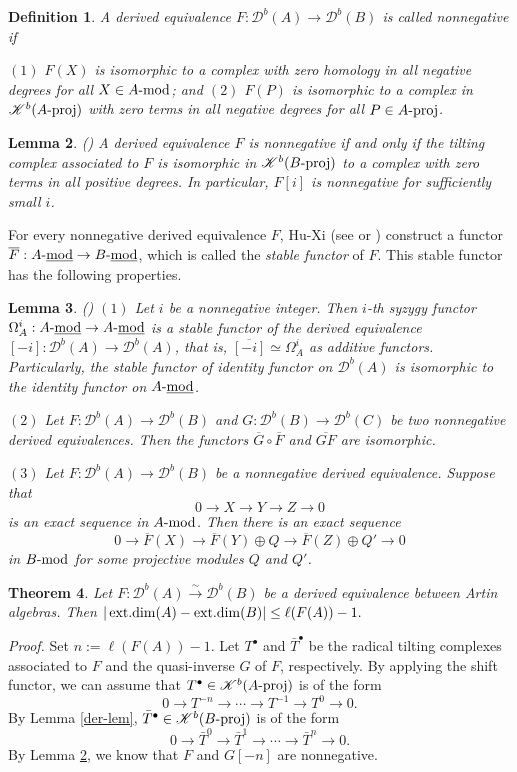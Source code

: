 \documentclass[12pt]{article}
\numberwithin{equation}{section}
\newtheorem{Def}{Definition}[section]
\newtheorem{Theo}[Def]{Theorem}
\newtheorem{Lem}[Def]{Lemma}
\theoremstyle{definition}
\def\ed{\mathop{\rm ext.dim}\nolimits}
\newcommand{\cpx}[1]{#1^{\bullet}}
\newcommand{\Db}[1]{{\mathscr D}^b(#1)}
\newcommand{\Kb}[1]{{\mathscr K}^b(#1)}
\newcommand{\modcat}{\ensuremath{\mbox{{\rm -mod}}}}
\newcommand{\stmodcat}[1]{#1\mbox{{\rm -{\underline{mod}}}}}
\newcommand{\pmodcat}[1]{#1\mbox{{\rm -proj}}}
\newcommand{\lra}{\longrightarrow}
\newcommand{\lraf}[1]{\stackrel{#1}{\lra}}
\newcommand{\ra}{\rightarrow}
\begin{document}
\begin{Def} A derived equivalence $F:\Db{A}\ra \Db{B}$ is called \emph{nonnegative} if

$(1)$ $F(X)$ is isomorphic to a complex with zero homology in all negative degrees for all $X\in A\modcat$; and
$(2)$ $F(P)$ is isomorphic to a complex in $\Kb{\pmodcat{A}}$ with zero terms in all negative degrees for all $P\in\pmodcat{A}$.
\end{Def}
\begin{Lem}\label{lem-nonneg}
{\rm (\cite[Lemma 4.2]{hp17})} A derived equivalence $F$ is nonnegative if and only if the tilting complex associated to $F$ is isomorphic in $\Kb{\pmodcat{B}}$ to a complex with zero terms in all positive degrees.
In particular, $F[i]$ is nonnegative for sufficiently small $i$.
\end{Lem}
For every nonnegative derived equivalence $F$, Hu-Xi (see \cite[Section 3]{hx10} or \cite[Section 4]{hp17}) construct a functor  $\overline{F}:\stmodcat{A}\ra \stmodcat{B}$, which is called the \emph{stable functor} of $F$.
This stable functor has the following properties.

\begin{Lem}\label{lem-non}{\rm (\cite[Section 4]{hp17})}
$(1)$ Let $i$ be a nonnegative integer. Then $i$-th syzygy functor $\Omega^{i}_{A}:\stmodcat{A}\ra \stmodcat{A}$ is a stable functor of the derived equivalence $[-i]:\Db{A}\ra \Db{A}$, that is, $\overline{[-i]}\simeq \Omega^i_A$ as additive functors. Particularly, the stable functor of identity functor on $\Db{A}$ is isomorphic to the identity functor on $\stmodcat{A}$.

$(2)$ Let $F:\Db{A}\ra \Db{B}$ and $G:\Db{B}\ra \Db{C}$ be two nonnegative derived equivalences. Then the functors $\overline{G}\circ \overline{F}$ and $\overline{GF}$ are isomorphic.

$(3)$ Let $F:\Db{A}\ra \Db{B}$ be a nonnegative derived equivalence. Suppose that $$0 \lra X\lra Y \lra Z\lra 0$$ is an exact sequence in $A\modcat$. Then there is an exact sequence
$$0 \lra \overline{F}(X) \lra \overline{F}(Y)\oplus Q \lra \overline{F}(Z)\oplus Q'\lra 0$$ in $B\modcat$ for some projective modules $Q$ and $Q'$.
\end{Lem}

\begin{Theo}\label{der-thm} Let $F:\Db{A}\lraf{\sim} \Db{B}$ be a derived equivalence between Artin algebras. Then $|\ed(A)-\ed(B)|\le \ell(F(A))-1.$
\end{Theo}
{\it Proof.} Set $n:=\ell(F(A))-1$. Let $\cpx{T}$ and $\cpx{\bar{T}}$ be the radical tilting complexes associated to $F$ and the quasi-inverse $G$ of $F$, respectively. By applying the shift functor, we can assume that $\cpx{T}\in\Kb{\pmodcat{A}}$ is of the form
$$0\lra T^{-n}\lra\cdots\lra T^{-1}\lra T^0\lra 0.$$
By Lemma \ref{der-lem}, $\cpx{\bar{T}}\in\Kb{\pmodcat{B}}$ is of the form
$$0\lra \bar{T}^0\lra \bar{T}^1\lra\cdots\lra\bar{T}^n\lra 0.$$
By Lemma \ref{lem-nonneg}, we know that $F$ and $G[-n]$ are nonnegative.
\end{document}
